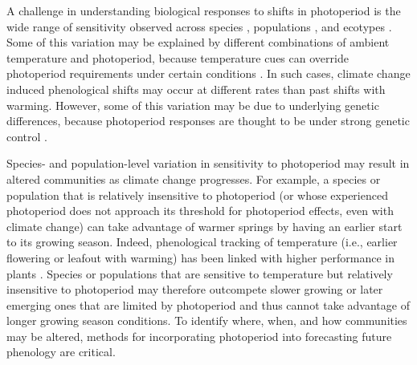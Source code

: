 \documentclass{article}
\begin{document}
\par A challenge in understanding biological responses to shifts in photoperiod is the wide range of sensitivity observed across species \citep{Sanz-Perez:2009aa, zohner2016,flynn2018}, populations \citep{tanino2010}, and ecotypes \citep{Howe:1995aa}. Some of this variation may be explained by different combinations of ambient temperature and photoperiod, because temperature cues can override photoperiod requirements under certain conditions \citep [e.g.,][] {tanino2010}. In such cases, climate change induced phenological shifts may occur at different rates than past shifts with warming. However, some of this variation may be due to underlying genetic differences, because photoperiod responses are thought to be under strong genetic control \citep{bradshaw1995,weih2004,keller2011}. 

\par Species- and population-level variation in sensitivity to photoperiod may result in altered communities as climate change progresses. For example, a species or population that is relatively insensitive to photoperiod (or whose experienced photoperiod does not approach its threshold for photoperiod effects, even with climate change) can take advantage of warmer springs by having an earlier start to its growing season. Indeed, phenological tracking of temperature (i.e., earlier flowering or leafout with warming) has been linked with higher performance in plants \citep{cleland2012}. Species or populations that are sensitive to temperature but relatively insensitive to photoperiod may therefore outcompete slower growing or later emerging ones that are limited by photoperiod and thus cannot take advantage of longer growing season conditions. To identify where, when, and how communities may be altered, methods for incorporating photoperiod into forecasting future phenology are critical. 

\end{document}
